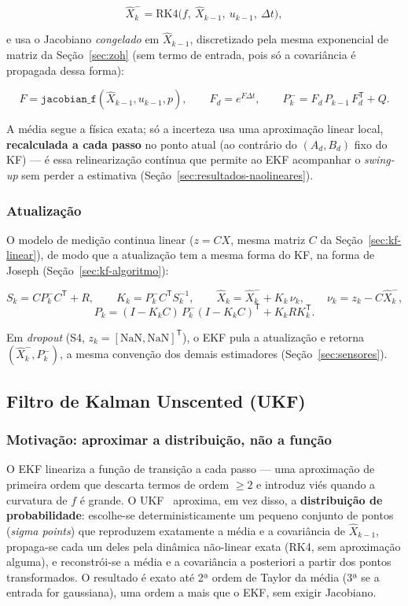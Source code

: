 \documentclass[brazil, 12pt]{article}
\begin{document}
\[
\hat X_k^{-} = \mathrm{RK4}\big(f,\ \hat X_{k-1},\ u_{k-1},\ \Delta t\big),
\]

e usa o Jacobiano \emph{congelado} em $\hat X_{k-1}$, discretizado pela mesma
exponencial de matriz da Seção~\ref{sec:zoh} (sem termo de entrada, pois só a
covariância é propagada dessa forma):

\[
F = \texttt{jacobian\_f}(\hat X_{k-1}, u_{k-1}, p),
\qquad
F_d = e^{F\Delta t},
\qquad
P_k^{-} = F_d\,P_{k-1}\,F_d^{\mathsf T} + Q.
\]

A média segue a física exata; só a incerteza usa uma aproximação linear
local, \textbf{recalculada a cada passo} no ponto atual (ao contrário do
$(A_d,B_d)$ fixo do KF) — é essa relinearização contínua que permite ao EKF
acompanhar o \emph{swing-up} sem perder a estimativa
(Seção~\ref{sec:resultados-naolineares}).

\subsubsection{Atualização}

O modelo de medição continua linear ($z=CX$, mesma matriz $C$ da
Seção~\ref{sec:kf-linear}), de modo que a atualização tem a mesma forma do
KF, na forma de Joseph (Seção~\ref{sec:kf-algoritmo}):

\[
S_k = C P_k^{-} C^{\mathsf T} + R,
\qquad
K_k = P_k^{-} C^{\mathsf T} S_k^{-1},
\qquad
\hat X_k = \hat X_k^{-} + K_k\,\nu_k,
\qquad
\nu_k = z_k - C\hat X_k^{-},
\]
\[
P_k = (I-K_kC)\,P_k^{-}(I-K_kC)^{\mathsf T} + K_k R K_k^{\mathsf T}.
\]

Em \emph{dropout} (S4, $z_k=[\mathrm{NaN},\mathrm{NaN}]^{\mathsf T}$), o EKF
pula a atualização e retorna $(\hat X_k^{-}, P_k^{-})$, a mesma convenção dos
demais estimadores (Seção~\ref{sec:sensores}).

\subsection{Filtro de Kalman Unscented (UKF)}
\label{sec:ukf}

\subsubsection{Motivação: aproximar a distribuição, não a função}

O EKF lineariza a função de transição a cada passo — uma aproximação de
primeira ordem que descarta termos de ordem $\geq 2$ e introduz viés quando a
curvatura de $f$ é grande. O UKF~\cite{wan2000} aproxima,
em vez disso, a \textbf{distribuição de probabilidade}: escolhe-se
deterministicamente um pequeno conjunto de pontos (\emph{sigma points}) que
reproduzem exatamente a média e a covariância de $\hat X_{k-1}$, propaga-se
cada um deles pela dinâmica não-linear exata (RK4, sem aproximação alguma), e
reconstrói-se a média e a covariância a posteriori a partir dos pontos
transformados. O resultado é exato até 2ª ordem de Taylor da média (3ª se a
entrada for gaussiana), uma ordem a mais que o EKF, sem exigir Jacobiano.
\end{document}
